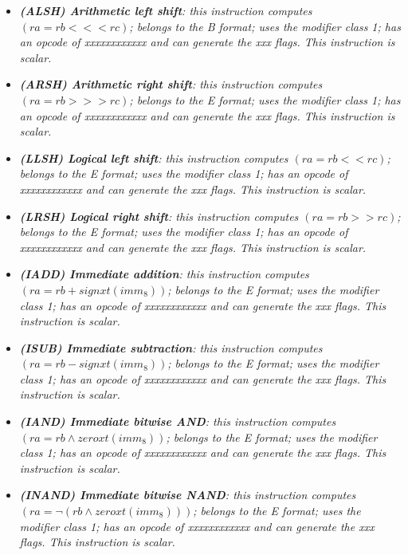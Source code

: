 \begin{multicols}{2}
\begin{itemize}
                \item \textit{\textbf{(ALSH) Arithmetic left shift}: this instruction computes \((ra = rb <<< rc)\); belongs to the B format; uses the modifier class 1; has an opcode of xxxxxxxxxxxx and can generate the xxx flags. This instruction is scalar.}

                \item \textit{\textbf{(ARSH) Arithmetic right shift}: this instruction computes \((ra = rb >>> rc)\); belongs to the E format; uses the modifier class 1; has an opcode of xxxxxxxxxxxx and can generate the xxx flags. This instruction is scalar.}

                \item \textit{\textbf{(LLSH) Logical left shift}: this instruction computes \((ra = rb << rc)\); belongs to the E format; uses the modifier class 1; has an opcode of xxxxxxxxxxxx and can generate the xxx flags. This instruction is scalar.}

                \item \textit{\textbf{(LRSH) Logical right shift}: this instruction computes \((ra = rb >> rc)\); belongs to the E format; uses the modifier class 1; has an opcode of xxxxxxxxxxxx and can generate the xxx flags. This instruction is scalar.}

                \item \textit{\textbf{(IADD) Immediate addition}: this instruction computes \((ra = rb + signxt(imm_8))\); belongs to the E format; uses the modifier class 1; has an opcode of xxxxxxxxxxxx and can generate the xxx flags. This instruction is scalar.}

                \item \textit{\textbf{(ISUB) Immediate subtraction}: this instruction computes \((ra = rb - signxt(imm_8))\); belongs to the E format; uses the modifier class 1; has an opcode of xxxxxxxxxxxx and can generate the xxx flags. This instruction is scalar.}

                \item \textit{\textbf{(IAND) Immediate bitwise AND}: this instruction computes \((ra = rb \wedge zeroxt(imm_8))\); belongs to the E format; uses the modifier class 1; has an opcode of xxxxxxxxxxxx and can generate the xxx flags. This instruction is scalar.}

                \item \textit{\textbf{(INAND) Immediate bitwise NAND}: this instruction computes \((ra = \neg(rb \wedge zeroxt(imm_8)))\); belongs to the E format; uses the modifier class 1; has an opcode of xxxxxxxxxxxx and can generate the xxx flags. This instruction is scalar.}


\end{itemize}
\end{multicols}
